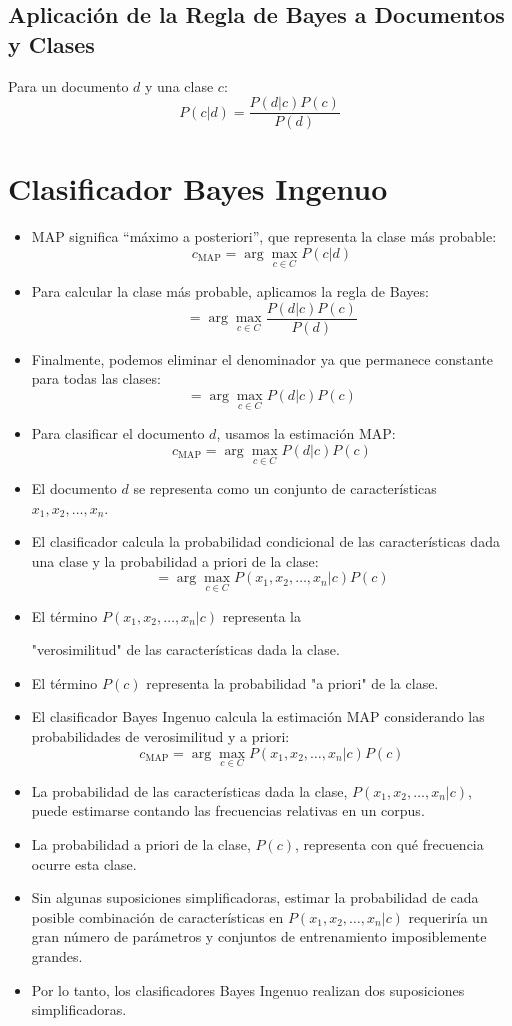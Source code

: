 \subsection{Aplicación de la Regla de Bayes a Documentos y Clases}
Para un documento $d$ y una clase $c$:
\[
P(c | d) = \frac{P(d | c)P(c)}{P(d)}
\]


\section{Clasificador Bayes Ingenuo}
\begin{itemize}
    \item MAP significa ``máximo a posteriori'', que representa la clase más probable:
    \[
    c_{\text{MAP}} = \arg\max_{c \in C} P(c | d)
    \]
    \item Para calcular la clase más probable, aplicamos la regla de Bayes:
    \[
    = \arg\max_{c \in C} \frac{P(d | c)P(c)}{P(d)}
    \]
    \item Finalmente, podemos eliminar el denominador ya que permanece constante para todas las clases:
    \[
    = \arg\max_{c \in C} P(d | c)P(c)
    \]
    \item Para clasificar el documento $d$, usamos la estimación MAP:
    \[
    c_{\text{MAP}} = \arg\max_{c \in C} P(d | c)P(c)
    \]
    \item El documento $d$ se representa como un conjunto de características $x_1, x_2, \ldots, x_n$.
    \item El clasificador calcula la probabilidad condicional de las características dada una clase y la probabilidad a priori de la clase:
    \[
    = \arg\max_{c \in C} P(x_1, x_2, \ldots, x_n | c)P(c)
    \]
    \item El término $P(x_1, x_2, \ldots, x_n | c)$ representa la

 "verosimilitud" de las características dada la clase.
    \item El término $P(c)$ representa la probabilidad "a priori" de la clase.
    \item El clasificador Bayes Ingenuo \cite{mccallum1998comparison} calcula la estimación MAP considerando las probabilidades de verosimilitud y a priori:
    \[
    c_{\text{MAP}} = \arg\max_{c \in C} P(x_1, x_2, \ldots, x_n | c)P(c)
    \]
    \item La probabilidad de las características dada la clase, $P(x_1, x_2, \ldots, x_n | c)$, puede estimarse contando las frecuencias relativas en un corpus.
    \item La probabilidad a priori de la clase, $P(c)$, representa con qué frecuencia ocurre esta clase.
    \item Sin algunas suposiciones simplificadoras, estimar la probabilidad de cada posible combinación de características en $P(x_1, x_2, \ldots, x_n | c)$ requeriría un gran número de parámetros y conjuntos de entrenamiento imposiblemente grandes.
    \item Por lo tanto, los clasificadores Bayes Ingenuo realizan dos suposiciones simplificadoras.
\end{itemize}


